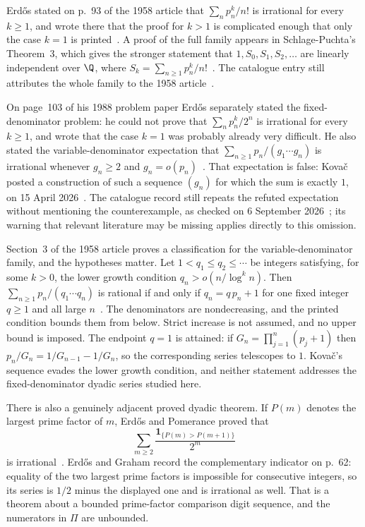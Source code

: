 Erd\H{o}s stated on p.~93 of the 1958 article that $\sum_n p_n^{k}/n!$ is
irrational for every $k\ge1$, and wrote there that the proof for $k>1$ is
complicated enough that only the case $k=1$ is
printed~\cite[pp.~93--95]{erdos1958}.  A proof of the full family appears in
Schlage-Puchta's Theorem~3, which gives the stronger statement that
$1,S_0,S_1,S_2,\ldots$ are linearly independent over $\Q$, where
$S_k=\sum_{n\ge1}p_n^{k}/n!$~\cite[Theorem~3]{schlagepuchta2011}.  The
catalogue entry still attributes the whole family to the 1958
article~\cite{erdosproblems}.

On page~103 of his 1988 problem paper Erd\H{o}s separately stated the
fixed-denominator problem: he could not prove that $\sum_n p_n^{k}/2^{n}$ is
irrational for every $k\ge1$, and wrote that the case $k=1$ was probably
already very difficult.  He also stated the variable-denominator expectation
that $\sum_{n\ge1}p_n/(g_1\cdots g_n)$ is irrational whenever $g_n\ge2$ and
$g_n=o(p_n)$~\cite[p.~103]{erdos1988}.  That expectation is false: Kova\v{c}
posted a construction of such a sequence $(g_n)$ for which the sum is exactly
$1$, on 15 April 2026~\cite[Theorem~1 and proof, pp.~1--2]{kovac2026}.  The
catalogue record still repeats the refuted expectation without mentioning the
counterexample, as checked on 6 September 2026~\cite{erdosproblems}; its
warning that relevant literature may be missing applies directly to this
omission.

Section~3 of the 1958 article proves a classification for the
variable-denominator family, and the hypotheses matter.  Let
$1<q_1\le q_2\le\cdots$ be integers satisfying, for some $k>0$, the lower
growth condition $q_n>o(n/\log^{k}n)$.  Then $\sum_{n\ge1}p_n/(q_1\cdots q_n)$
is rational if and only if $q_n=q\,p_n+1$ for one fixed integer $q\ge1$ and all
large $n$~\cite[pp.~96--97]{erdos1958}.  The denominators are nondecreasing,
and the printed condition bounds them from below.  Strict increase is not
assumed, and no upper bound is imposed.  The endpoint $q=1$ is attained: if
$G_n=\prod_{j=1}^{n}(p_j+1)$ then $p_n/G_n=1/G_{n-1}-1/G_n$, so the
corresponding series telescopes to $1$.  Kova\v{c}'s sequence evades the lower
growth condition, and neither statement addresses the fixed-denominator dyadic
series studied here.

There is also a genuinely adjacent proved dyadic theorem.  If $P(m)$ denotes
the largest prime factor of $m$, Erd\H{o}s and Pomerance proved that
\[
 \sum_{m\ge2}\frac{\mathbf 1_{\{P(m)>P(m+1)\}}}{2^m}
\]
is irrational~\cite[\S7, p.~320]{erdospomerance1978}.  Erd\H{o}s and Graham
record the complementary indicator on p.~62: equality of the two largest prime
factors is impossible for consecutive integers, so its series is $1/2$ minus
the displayed one and is irrational as well.  That is a theorem about a bounded
prime-factor comparison digit sequence, and the numerators in $\Pi$ are
unbounded.

